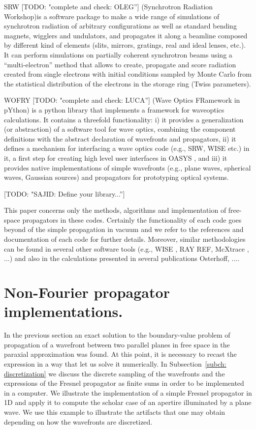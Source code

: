 \documentclass{iucr}              %
\newcommand{\todo}[1]{{\color{red}[TODO: "#1'']}}
\newcommand{\inred}[1]{{\color{red}#1}}
\begin{document}
SRW \todo{complete and check: OLEG} \cite{Chubar1998} (Synchrotron Radiation Workshop)is a software package to make a wide range of simulations of synchrotron radiation of arbitrary configurations as well as standard bending magnets, wigglers and undulators, and propagates it along a beamline composed by different kind of elements (slits, mirrors, gratings, real and ideal lenses, etc.). It can perform simulations on partially coherent synchrotron beams using a ``multi-electron'' method that allows to create, propagate and score radiation created from single electrons with initial conditions sampled by Monte Carlo from the statistical distribution of the electrons in the storage ring (Twiss parameters).

WOFRY \todo{complete and check: LUCA} \cite{Wofrygit} (Wave Optics FRamework in pYthon) is a python library that implements a framework for waveoptics calculations. It contains a threefold functionality: i) it provides a generalization (or abstraction) of a software tool for wave optics, combining the component definitions with the abstract declaration of wavefronts and propagators, ii) it defines a mechanism for interfacing a wave optics code (e.g., SRW, WISE etc.) in it, a first step for creating high level user interfaces in OASYS \cite{oasys}, and iii) it provides native implementations of simple wavefronts (e.g., plane waves, spherical waves, Gaussian sources) and propagators for prototyping optical systems.

\todo{SAJID: Define your library...}

This paper concerns only the methods, algorithms and implementation of free-space propagators in these codes. Certainly the functionality of each code goes beyond of the simple propagation in vacuum and we refer to the references and documentation of each code for further details. Moreover, similar methodologies can be found in several other software tools (e.g., WISE \cite{wise}, RAY \inred{REF}, McXtrace \cite{mcxtrace}, ...) and also in the calculations presented in several publications \inred{Osterhoff, ...}.


\section{Non-Fourier propagator implementations.}
\label{ch: non-fourier-propagators}

In the previous section an exact solution to the boundary-value problem of propagation of a wavefront between two parallel planes in free space in the paraxial approximation was found. At this point, it is necessary to recast the expression in a way that let us solve it numerically. In Subsection~\ref{subch: discretization} we discuss the discrete sampling of the wavefronts and the expressions of the Fresnel propagator as finite sums in order to be implemented in a computer. We illustrate the implementation of a simple Fresnel propagator in 1D and apply it to compute the scholar case of an apertire illuminated by a plane wave. We use this example to illustrate the artifacts that one may obtain depending on how the wavefronts are discretized.
\end{document}
